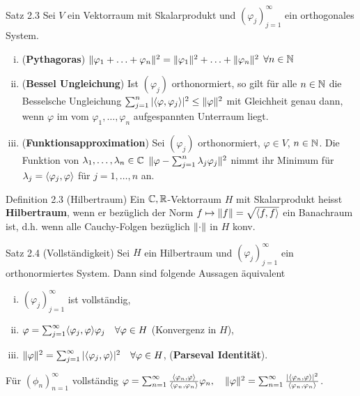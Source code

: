 \begin{namedtheorem}{Satz 2.3}
  Sei $V$ ein Vektorraum mit Skalarprodukt und $(\varphi_j)_{j=1}^{\infty}$ ein orthogonales System.
  \begin{enumerate}[(i)]
    \item (\textbf{Pythagoras}) $\lVert\varphi_1+\ldots+\varphi_n\rVert^2=\lVert\varphi_1\rVert^2+\ldots+\lVert\varphi_n\rVert^2$ $\forall n\in\mathbb{N}$
    \item (\textbf{Bessel Ungleichung}) Ist $(\varphi_j)$ orthonormiert, so gilt für alle $n\in\mathbb{N}$ die Besselsche Ungleichung $\sum_{j=1}^n |\langle \varphi,\varphi_j \rangle|^2 \leq \lVert\varphi\rVert^2$ mit Gleichheit genau dann, wenn $\varphi$ im vom $\varphi_1, \ldots, \varphi_n$ aufgespannten Unterraum liegt.
    \item (\textbf{Funktionsapproximation}) Sei $(\varphi_j)$ orthonormiert, $\varphi\in V$, $n\in\mathbb{N}$. Die Funktion von $\lambda_1, \ldots, \lambda_n\in\mathbb{C}$ $\lVert\varphi-\sum_{j=1}^n\lambda_j\varphi_j\rVert^2$ nimmt ihr Minimum für $\lambda_j=\langle \varphi_j,\varphi \rangle$ für $j=1,\ldots,n$ an. 
  \end{enumerate}
\end{namedtheorem}

\begin{namedtheorem}{Definition 2.3 (Hilbertraum)}
  Ein $\mathbb{C},\mathbb{R}$-Vektorraum $H$ mit Skalarprodukt heisst \textbf{Hilbertraum}, wenn er bezüglich der Norm $f\mapsto\lVert f\rVert=\sqrt{\langle f,f \rangle}$ ein Banachraum ist, d.h. wenn alle Cauchy-Folgen bezüglich $\lVert\cdot\rVert$ in $H$ konv.
\end{namedtheorem}

\begin{namedtheorem}{Satz 2.4 (Vollständigkeit)}
  Sei $H$ ein Hilbertraum und $(\varphi_j)_{j=1}^{\infty}$ ein orthonormiertes System. Dann sind folgende Aussagen äquivalent
  \begin{enumerate}[(i)]
    \item $(\varphi_j)_{j=1}^{\infty}$ ist vollständig,
    \item $\varphi=\sum_{j=1}^{\infty}\langle \varphi_j,\varphi \rangle\varphi_j\quad \forall\varphi\in H$ \hfill (Konvergenz in $H$),
    \item $\lVert\varphi\rVert^2 = \sum_{j=1}^{\infty} |\langle \varphi_j,\varphi \rangle|^2\quad \forall\varphi\in H$, \hfill (\textbf{Parseval Identität}).
  \end{enumerate}
\end{namedtheorem}

Für $(\phi_n)_{n=1}^{\infty}$ vollständig $\varphi=\sum_{n=1}^{\infty}\frac{\langle \varphi_n,\varphi \rangle}{\langle \varphi_n,\varphi_n \rangle}\varphi_n,\quad \lVert\varphi\rVert^2=\sum_{n=1}^{\infty}\frac{|\langle \varphi_n,\varphi \rangle|^2}{\langle \varphi_n,\varphi_n \rangle}$.


